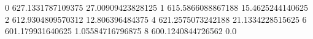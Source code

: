 0 627.1331787109375 27.00909423828125
1 615.5866088867188 15.4625244140625
2 612.9304809570312 12.806396484375
4 621.2575073242188 21.1334228515625
6 601.179931640625 1.05584716796875
8 600.1240844726562 0.0
